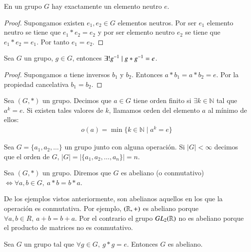 \begin{pro}
	En un grupo $G$ hay exactamente un elemento neutro $e$.
\end{pro}

\begin{proof}
	Supongamos existen $e_1, e_2 \in G$ elementos neutros. Por ser $e_1$ elemento neutro se tiene que $e_1 \ast e_2 = e_2$ y por ser elemento neutro $e_2$ se tiene que $e_1 \ast e_2 = e_1$. Por tanto $e_1 = e_2$.
\end{proof}

\begin{pro}
	Sea $G$ un grupo, $g \in G$, entonces $\exists! g^{-1} \mid g \ast g^{-1} = e$. 
\end{pro}

\begin{proof}
	Supongamos $a$ tiene inversos $b_1$ y $b_2$. Entonces $a \ast b_1 = a \ast b_2 = e$. Por la propiedad cancelativa $b_1 = b_2$.
\end{proof}

\begin{dfn}
	Sea $(G, \ast)$ un grupo. Decimos que $a \in G$ tiene orden finito si $\exists k \in \mathbb{N}$ tal que $a^k = e$.
	Si existen tales valores de $k$, llamamos orden del elemento $a$ al mínimo de ellos:
	\begin{align}
		o(a) = \min \{k \in \mathbb{N} \mid a^k = e \}
	\end{align}
\end{dfn}

\begin{dfn}
	Sea $G = \{a_1, a_2, \dots \}$ un grupo junto con alguna operación. Si $|G| < \infty$ decimos que el orden de $G$, $|G| = |\{a_1, a_2, \dots, a_n\}| = n$.
\end{dfn}

\begin{dfn}
	Sea $(G, \ast)$ un grupo. Diremos que $G$ es abeliano (o conmutativo) $\iff \forall a,b \in G,\ a \ast b = b \ast a$.
\end{dfn}

De los ejemplos vistos anteriormente, son abelianos aquellos en los que la operación es conmutativa. Por ejemplo, $(\mathbb{R}, +)$ es abeliano porque $\forall a,b \in R,\ a+b = b+a$. Por el contrario el grupo $GL_2(\mathbb{R})$ no es abeliano porque el producto de matrices no es conmutativo.

\begin{thm}
	\label{thm:abelianosdeorden2}
	Sea $G$ un grupo tal que $\forall g \in G,\ g \ast g = e$. Entonces $G$ es abeliano.
\end{thm}

